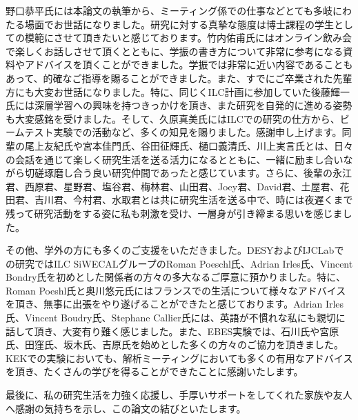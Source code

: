 野口恭平氏には本論文の執筆から、ミーティング係での仕事などとても多岐にわたる場面でお世話になりました。研究に対する真摯な態度は博士課程の学生としての模範にさせて頂きたいと感じております。竹内佑甫氏にはオンライン飲み会で楽しくお話しさせて頂くとともに、学振の書き方について非常に参考になる資料やアドバイスを頂くことができました。学振では非常に近い内容であることもあって、的確なご指導を賜ることができました。また、すでにご卒業された先輩方にも大変お世話になりました。特に、同じくILC計画に参加していた後藤輝一氏には深層学習への興味を持つきっかけを頂き、また研究を自発的に進める姿勢も大変感銘を受けました。そして、久原真美氏にはILCでの研究の仕方から、ビームテスト実験での活動など、多くの知見を賜りました。感謝申し上げます。同輩の尾上友紀氏や宮本佳門氏、谷田征輝氏、樋口義清氏、川上実言氏とは、日々の会話を通じて楽しく研究生活を送る活力になるとともに、一緒に励まし合いながら切磋琢磨し合う良い研究仲間であったと感じています。さらに、後輩の永江君、西原君、星野君、塩谷君、梅林君、山田君、Joey君、David君、土屋君、花田君、吉川君、今村君、水取君とは共に研究生活を送る中で、時には夜遅くまで残って研究活動をする姿に私も刺激を受け、一層身が引き締まる思いを感じました。

その他、学外の方にも多くのご支援をいただきました。DESYおよびIJCLabでの研究ではILC SiWECALグループのRoman Poeschl氏、Adrian Irles氏、Vincent Bondry氏を初めとした関係者の方々の多大なるご厚意に預かりました。特に、Roman Poeshl氏と奥川悠元氏にはフランスでの生活について様々なアドバイスを頂き、無事に出張をやり遂げることができたと感じております。Adrian Irles氏、Vincent Boudry氏、Stephane Callier氏には、英語が不慣れな私にも親切に話して頂き、大変有り難く感じました。また、EBES実験では、石川氏や宮原氏、田窪氏、坂木氏、吉原氏を始めとした多くの方々のご協力を頂きました。KEKでの実験においても、解析ミーティングにおいても多くの有用なアドバイスを頂き、たくさんの学びを得ることができたことに感謝いたします。

最後に、私の研究生活を力強く応援し、手厚いサポートをしてくれた家族や友人へ感謝の気持ちを示し、この論文の結びといたします。